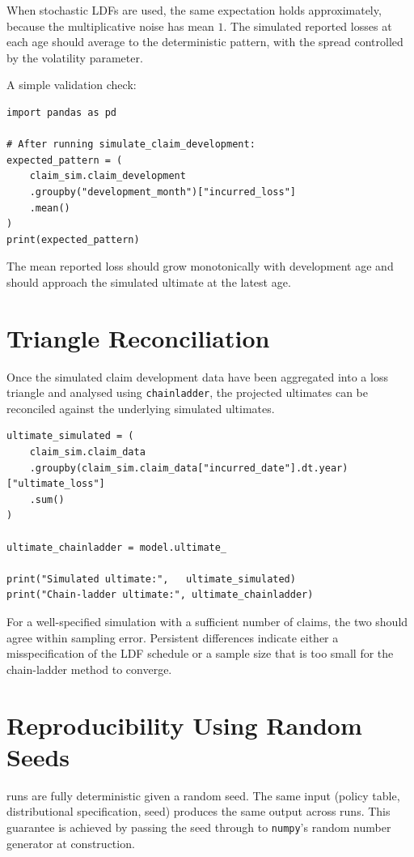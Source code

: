 When stochastic LDFs are used, the same expectation holds approximately,
because the multiplicative noise has mean $1$. The simulated reported
losses at each age should average to the deterministic pattern, with
the spread controlled by the volatility parameter.

A simple validation check:

\begin{lstlisting}[style=pythonstyle]
import pandas as pd

# After running simulate_claim_development:
expected_pattern = (
    claim_sim.claim_development
    .groupby("development_month")["incurred_loss"]
    .mean()
)
print(expected_pattern)
\end{lstlisting}

The mean reported loss should grow monotonically with development age
and should approach the simulated ultimate at the latest age.

\section{Triangle Reconciliation}

Once the simulated claim development data have been aggregated into a
loss triangle and analysed using \texttt{chainladder}, the projected
ultimates can be reconciled against the underlying simulated ultimates.

\begin{lstlisting}[style=pythonstyle]
ultimate_simulated = (
    claim_sim.claim_data
    .groupby(claim_sim.claim_data["incurred_date"].dt.year)["ultimate_loss"]
    .sum()
)

ultimate_chainladder = model.ultimate_

print("Simulated ultimate:",   ultimate_simulated)
print("Chain-ladder ultimate:", ultimate_chainladder)
\end{lstlisting}

For a well-specified simulation with a sufficient number of claims, the
two should agree within sampling error. Persistent differences indicate
either a misspecification of the LDF schedule or a sample size that is
too small for the chain-ladder method to converge.

\section{Reproducibility Using Random Seeds}

\actsim runs are fully deterministic given a random seed. The same
input (policy table, distributional specification, seed) produces the
same output across runs. This guarantee is achieved by passing the seed
through to \texttt{numpy}'s random number generator at construction.


